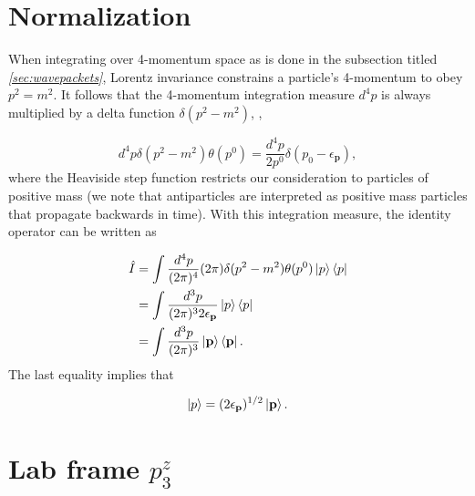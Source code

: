 \documentclass{article}
\begin{document}
\pagebreak
\section{Normalization}
\label{app:normalization}

When integrating over 4-momentum space as is done in the subsection titled
\textit{\ref{sec:wavepackets}}, Lorentz invariance constrains a particle's
4-momentum to obey $p^2 = m^2$.
It follows that the 4-momentum integration measure $d^4p$ is always multiplied
by a delta function $\delta(p^2-m^2)$, ,

\begin{equation}
    d^4p\delta(p^2 - m^2)\theta(p^0)
    =
    \frac{d^4p}{2p^0}\delta(p_0 - \epsilon_\mathbf{p}),
\end{equation}
%
where the Heaviside step function restricts our consideration to particles of
positive mass (we note that antiparticles are interpreted as positive mass
particles that propagate backwards in time).  With this integration measure,
the identity operator can be written as

\begin{equation}
\label{eq:identity}
\begin{aligned}
    \hat{I}
    &=
    \int \frac{d^4p}{(2\pi)^4}(2\pi)\delta(p^2 - m^2)\theta(p^0)
    \ket{p}\bra{p}
    \\&=
    \int \frac{d^3p}{(2\pi)^3 2\epsilon_\mathbf{p}}
    \ket{p}\bra{p}
    \\&=
    \int \frac{d^3p}{(2\pi)^3}
    \ket{\mathbf{p}}\bra{\mathbf{p}}.
\end{aligned}
\end{equation}
%
The last equality implies that

\begin{equation}
\label{eq:normalization}
    \ket{p} = (2\epsilon_\mathbf{p})^{1/2}\ket{\mathbf{p}}.
\end{equation}


\pagebreak
\section{Lab frame $p^z_3$}
\label{app:p3z}
\end{document}
